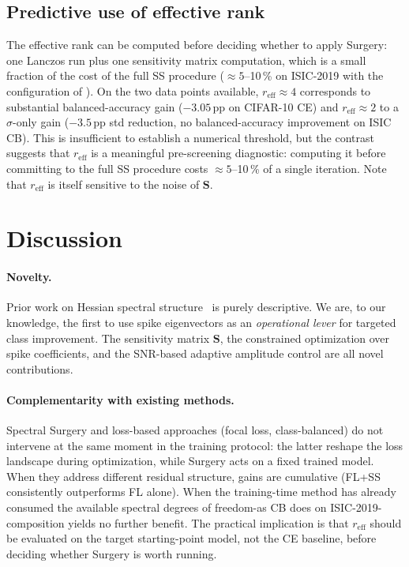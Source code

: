 \documentclass[11pt,a4paper]{article}
\newcommand{\mat}[1]{\bm{#1}}
\begin{document}
\subsection{Predictive use of effective rank}

The effective rank can be computed before deciding whether to apply
Surgery: one Lanczos run plus one sensitivity matrix computation,
which is a small fraction of the cost of the full SS procedure
($\approx 5$--10\,\% on ISIC-2019 with the configuration of
). On the two data points available, $r_{\mathrm{eff}} \approx 4$
corresponds to substantial balanced-accuracy gain ($-3.05$\,pp on
CIFAR-10 CE) and $r_{\mathrm{eff}} \approx 2$ to a $\sigma$-only
gain ($-3.5$\,pp std reduction, no balanced-accuracy improvement
on ISIC CB). This is insufficient to establish a numerical
threshold, but the contrast suggests that $r_{\mathrm{eff}}$ is a
meaningful
pre-screening diagnostic: computing it before committing to the
full SS procedure costs $\approx 5$--10\,\% of a single iteration. Note that $r_{\mathrm{eff}}$ is itself sensitive to the noise 
of $\mat{S}$. 



\section{Discussion}
\label{sec:discussion}

\paragraph{Novelty.}
Prior work on Hessian spectral
structure~\cite{sagun2017,ghorbani2019,papyan2020,fort2019,yao2020} is
purely descriptive. We are, to our knowledge, the first to use spike
eigenvectors as an \emph{operational lever} for targeted class
improvement. The sensitivity matrix $\mat{S}$, the constrained optimization over
spike coefficients, and the SNR-based adaptive amplitude control are
all novel contributions.

\paragraph{Complementarity with existing methods.}
Spectral Surgery and loss-based approaches (focal loss,
class-balanced) do not intervene at the same moment in the training
protocol: the latter reshape the loss landscape during optimization,
while Surgery acts on a fixed trained model. When they address
different residual structure, gains are cumulative (FL+SS consistently
outperforms FL alone). When the training-time method has already
consumed the available spectral degrees of freedom-as CB does on
ISIC-2019-composition yields no further benefit. The practical
implication is that $r_{\mathrm{eff}}$ should be evaluated on the
target starting-point model, not the CE baseline, before deciding
whether Surgery is worth running.
\end{document}
